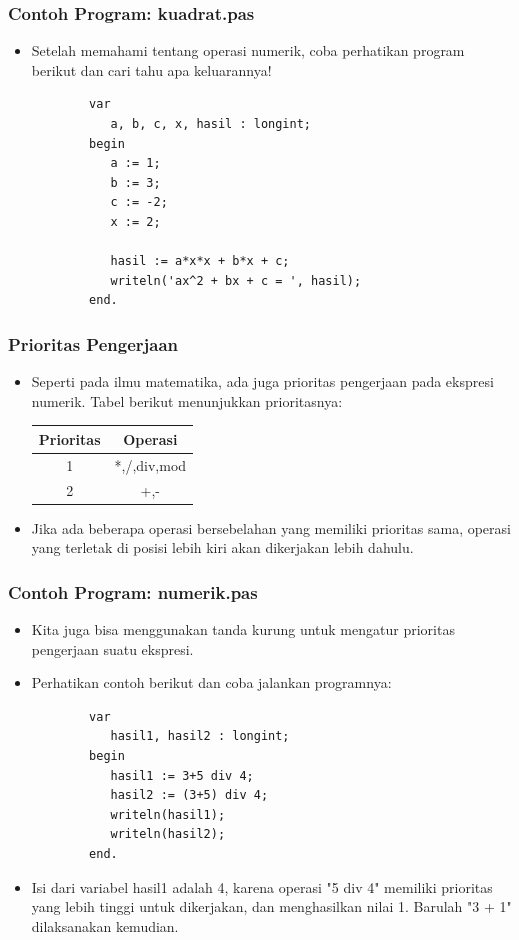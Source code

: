 \documentclass{beamer}
\begin{document}
\begin{frame}[fragile]
\frametitle{Contoh Program: kuadrat.pas}
\begin{itemize}
	\item Setelah memahami tentang operasi numerik, coba perhatikan program berikut dan cari tahu apa keluarannya!
	\begin{lstlisting}
		var
		   a, b, c, x, hasil : longint;
		begin
		   a := 1;
		   b := 3;
		   c := -2;
		   x := 2;	   
		
		   hasil := a*x*x + b*x + c;
		   writeln('ax^2 + bx + c = ', hasil);
		end.
	\end{lstlisting}
\end{itemize}
\end{frame}

\begin{frame}
\frametitle{Prioritas Pengerjaan}
\begin{itemize}
	\item Seperti pada ilmu matematika, ada juga prioritas pengerjaan pada ekspresi numerik. Tabel berikut menunjukkan prioritasnya:
	
	\begin{tabular}{|c|c|}
	\hline Prioritas & Operasi \\ 
	\hline 1 & *,/,div,mod \\ 
	\hline 2 & +,- \\ 
	\hline 
	\end{tabular} 
	\item Jika ada beberapa operasi bersebelahan yang memiliki prioritas sama, operasi yang terletak di posisi lebih kiri akan dikerjakan lebih dahulu.
\end{itemize}
\end{frame}

\begin{frame}[fragile]
\frametitle{Contoh Program: numerik.pas}
\begin{itemize}
	\item Kita juga bisa menggunakan tanda kurung untuk mengatur prioritas pengerjaan suatu ekspresi.
	\item Perhatikan contoh berikut dan coba jalankan programnya:
	\begin{lstlisting}
		var
		   hasil1, hasil2 : longint;
		begin
		   hasil1 := 3+5 div 4;
		   hasil2 := (3+5) div 4;
		   writeln(hasil1);
		   writeln(hasil2);
		end.
	\end{lstlisting}
	\item Isi dari variabel hasil1 adalah 4, karena operasi "5 div 4" memiliki prioritas yang lebih tinggi untuk dikerjakan, dan menghasilkan nilai 1. Barulah "3 + 1" dilaksanakan kemudian. 
\end{itemize}
\end{frame}
\end{document}
